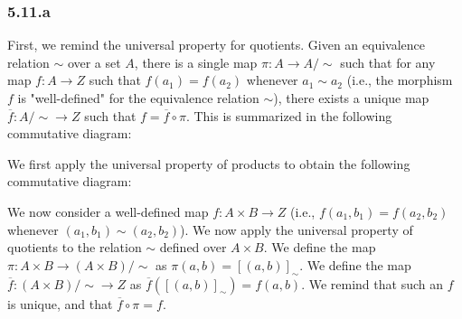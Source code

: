 \subsubsection*{5.11.a}

First, we remind the universal property for quotients. Given an equivalence relation $\sim$ over a set $A$, there is a single map $\pi : A \to A/\sim$ such that for any map $f : A \to Z$ such that $f(a_1) = f(a_2)$ whenever $a_1 \sim a_2$ (i.e., the morphism $f$ is "well-defined" for the equivalence relation $\sim$), there exists a unique map $\overline{f} : A/\sim \to Z$ such that $f = \overline{f} \circ \pi$. This is summarized in the following commutative diagram:


We first apply the universal property of products to obtain the following commutative diagram:


We now consider a well-defined map $f : A \times B \to Z$ (i.e., $f(a_1, b_1) = f(a_2, b_2)$ whenever $(a_1, b_1) \sim (a_2, b_2)$). We now apply the universal property of quotients to the relation $\sim$ defined over $A \times B$. We define the map $\pi : A \times B \to (A \times B)/\sim$ as $\pi(a,b) = [(a,b)]_\sim$. We define the map $\overline{f} : (A \times B)/\sim \to Z$ as $\overline{f}([(a,b)]_\sim) = f(a,b)$. We remind that such an $f$ is unique, and that $\overline{f} \circ \pi = f$.

